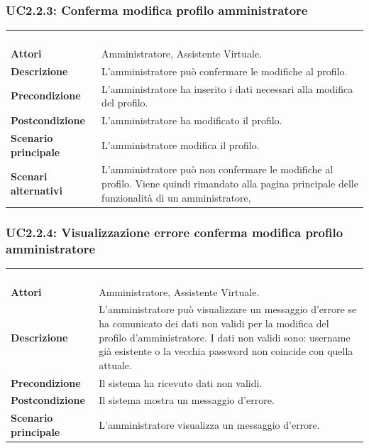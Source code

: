 \subsubsection{UC2.2.3: Conferma modifica profilo amministratore}
\label{UC2.2.3}
\begin{longtable}{l|p{10cm}}
	\rowcolor[gray]{0.8} \multicolumn{2}{c}{} \\
	\rowcolor[gray]{0.8} \multicolumn{2}{c}{\textbf{UC2.2.3 - Conferma modifica profilo amministratore}} \\
	\rowcolor[gray]{0.8} \multicolumn{2}{c}{} \\
	\hline
	&\\
	\textbf{Attori} & Amministratore, Assistente Virtuale.\\[7pt]
	\textbf{Descrizione} & L'amministratore può confermare le modifiche al profilo.\\[7pt]
	\textbf{Precondizione} & L'amministratore ha inserito i dati necessari alla modifica del profilo.\\[7pt]
	\textbf{Postcondizione} & L'amministratore ha modificato il profilo.\\[7pt]
	\textbf{Scenario principale} &L'amministratore modifica il profilo.\\[7pt]
	\textbf{Scenari alternativi} & L'amministratore può non confermare le modifiche al profilo. Viene quindi rimandato alla pagina principale delle funzionalità di un amministratore,\\[7pt]\hline
\end{longtable}

\subsubsection{UC2.2.4: Visualizzazione errore conferma modifica profilo amministratore }
\label{UC2.2.4}
\begin{longtable}{l|p{10cm}}
	\rowcolor[gray]{0.8} \multicolumn{2}{c}{} \\
	\rowcolor[gray]{0.8} \multicolumn{2}{c}{\textbf{UC2.2.4 - Visualizzazione errore conferma modifica profilo amministratore }} \\
	\rowcolor[gray]{0.8} \multicolumn{2}{c}{} \\
	\hline
	&\\
	\textbf{Attori} & Amministratore, Assistente Virtuale.\\[7pt]
	\textbf{Descrizione} & L'amministratore può visualizzare un messaggio d'errore se ha comunicato dei dati non validi per la modifica del profilo d'amministratore.
	I dati non validi sono: username già esistente o la vecchia password non coincide con quella attuale.\\[7pt]
	\textbf{Precondizione} & Il sistema ha ricevuto dati non validi.\\[7pt]
	\textbf{Postcondizione} & Il sistema mostra un messaggio d'errore.\\[7pt]
	\textbf{Scenario principale} &L'amministratore visualizza un messaggio d'errore.\\[7pt]\hline
\end{longtable}

